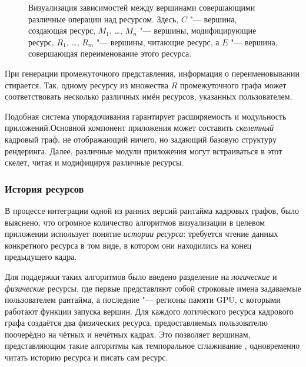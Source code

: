 \begin{figure*}[ht]
\centering
{}
\caption{Визуализация зависимостей между вершинами совершающими различные операции над ресурсом. Здесь, $C$ "--- вершина, создающая ресурс, $M_1$, \dots, $M_n$ "--- вершины, модифицирующие ресурс, $R_1$, \dots, $R_m$ "--- вершины, читающие ресурс, а $E$ "--- вершина, совершающая переименование этого ресурса.}
\label{fig:nodeOrdering}
\end{figure*}


При генерации промежуточного представления, информация о переименовывании стирается.
Так, одному ресурсу из множества $R$ промежуточного графа может соответствовать несколько различных имён ресурсов, указанных пользователем.

Подобная система упорядочивания гарантирует расширяемость и модульность приложений.Основной компонент приложения может составить \textit{скелетный} кадровый граф, не отображающий ничего, но задающий базовую структуру рендеринга.
Далее, различные модули приложения могут встраиваться в этот скелет, читая и модифицируя различные ресурсы.

\subsubsection{История ресурсов}
В процессе интеграции одной из ранних версий рантайма кадровых графов, было выяснено, что огромное количество алгоритмов визуализации в целевом приложении использует понятие \textit{истории ресурса}: требуется чтение данных конкретного ресурса в том виде, в котором они находились на конец предыдущего кадра.

Для поддержки таких алгоритмов было введено разделение на \textit{логические} и \textit{физические} ресурсы, где первые представляют собой строковые имена задаваемые пользователем рантайма, а последние "--- регионы памяти GPU, с которыми работают функции запуска вершин.
Для каждого логического ресурса кадрового графа создаётся два физических ресурса, предоставляемых пользователю поочерёдно на чётных и нечётных кадрах.
Это позволяет вершинам, представляющим такие алгоритмы как темпоральное сглаживание \cite{yang2020survey}, одновременно читать историю ресурса и писать сам ресурс.

